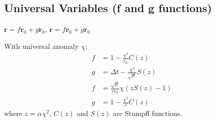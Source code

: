 \subsection{Universal Variables (f and g functions)}

$\mathbf{r} = f \mathbf{r}_0 + g \dot{\mathbf{r}}_0$,
$\dot{\mathbf{r}} = \dot{f} \mathbf{r}_0 + \dot{g} \dot{\mathbf{r}}_0$

With universal anomaly $\chi$:
\begin{align*}
f &= 1 - \frac{\chi^2}{r_0} C(z) \\
g &= \Delta t - \frac{\chi^3}{\sqrt{\mu}} S(z) \\
\dot{f} &= \frac{\sqrt{\mu}}{r r_0} \chi (z S(z) - 1) \\
\dot{g} &= 1 - \frac{\chi^2}{r} C(z)
\end{align*}
where $z = \alpha \chi^2$, $C(z)$ and $S(z)$ are Stumpff functions.